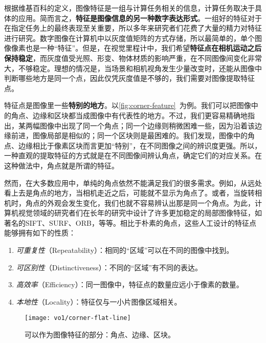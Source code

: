 根据维基百科的定义，图像特征是一组与计算任务相关的信息，计算任务取决于具体的应用\textsuperscript{\cite{wiki:featurecv}}。简而言之，\textbf{特征是图像信息的另一种数字表达形式}。一组好的特征对于在指定任务上的最终表现至关重要，所以多年来研究者们花费了大量的精力对特征进行研究。数字图像在计算机中以灰度值矩阵的方式存储，所以最简单的，单个图像像素也是一种“特征”。但是，在视觉里程计中，我们希望\textbf{特征点在相机运动之后保持稳定}，而灰度值受光照、形变、物体材质的影响严重，在不同图像间变化非常大，不够稳定。理想的情况是，当场景和相机视角发生少量改变时，还能从图像中判断哪些地方是同一个点，因此仅凭灰度值是不够的，我们需要对图像提取特征点。

特征点是图像里一些\textbf{特别的地方}。以\autoref{fig:corner-feature}~为例。我们可以把图像中的角点、边缘和区块都当成图像中有代表性的地方。不过，我们更容易精确地指出，某两幅图像中出现了同一个角点；同一个边缘则稍微困难一些，因为沿着该边缘前进，图像局部是相似的；同一个区块则是最困难的。我们发现，图像中的角点、边缘相比于像素区块而言更加“特别”，在不同图像之间的辨识度更强。所以，一种直观的提取特征的方式就是在不同图像间辨认角点，确定它们的对应关系。在这种做法中，角点就是所谓的特征。

然而，在大多数应用中，单纯的角点依然不能满足我们的很多需求。例如，从远处看上去是角点的地方，当相机走近之后，可能就不显示为角点了。或者，当旋转相机时，角点的外观会发生变化，我们也就不容易辨认出那是同一个角点。为此，计算机视觉领域的研究者们在长年的研究中设计了许多更加稳定的局部图像特征，如著名的SIFT\textsuperscript{\cite{Lowe2004}}、SURF\textsuperscript{\cite{Bay2006}}、ORB\textsuperscript{\cite{Rublee2011}}，等等。相比于朴素的角点，这些人工设计的特征点能够拥有如下的性质：

\begin{enumerate}
\item \emph{可重复性}（Repeatability）：相同的“区域”可以在不同的图像中找到。
\item \emph{可区别性}（Distinctiveness）：不同的“区域”有不同的表达。
\item \emph{高效率}（Efficiency）：同一图像中，特征点的数量应远小于像素的数量。
\item \emph{本地性}（Locality）：特征仅与一小片图像区域相关。
\end{enumerate}

\begin{figure}[!ht]
    \centering
    \texttt{[image: vo1/corner-flat-line]}\\
    \caption{可以作为图像特征的部分：角点、边缘、区块。}
    \label{fig:corner-feature}
\end{figure}

